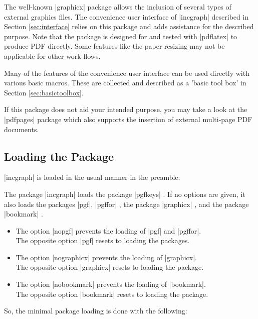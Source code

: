 \documentclass[a4paper,11pt]{ltxdoc}
\begin{document}
The well-known |graphicx| package \cite{carlisle:1999a} allows the inclusion
of several types of external graphics files. The convenience user interface
of |incgraph| described in Section \ref{sec:interface} relies on this package and adds
assistance for the described purpose. Note that the package is designed for and
tested with |pdflatex| to produce PDF directly. Some features like the paper
resizing may not be applicable for other work-flows.

Many of the features of the convenience user interface can be used directly
with various basic macros. These are collected and described
as a 'basic tool box' in Section \ref{sec:basictoolbox}.

If this package does not aid your intended purpose, you may take a look
at the |pdfpages| package \cite{matthias:2012a} which also supports the insertion of
external multi-page PDF documents.


\subsection{Loading the Package}
|incgraph| is loaded in the usual manner in the preamble:
\begin{dispListing}
\usepackage{incgraph}
\end{dispListing}

The package |incgraph| loads the package
|pgfkeys| \cite{tantau:2010c}. If no options are given, it also
loads the packages |pgf|, |pgffor| \cite{tantau:2010c},
the package |graphicx| \cite{carlisle:1999a}, and the
package |bookmark| \cite{oberdiek:2011a}.

\begin{itemize}
\item The option |nopgf| prevents the loading of |pgf| and |pgffor|.\\
  The opposite option |pgf| resets to loading the packages.
\item The option |nographicx| prevents the loading of |graphicx|.\\
  The opposite option |graphicx| resets to loading the package.
\item The option |nobookmark| prevents the loading of |bookmark|.\\
  The opposite option |bookmark| resets to loading the package.
\end{itemize}

So, the minimal package loading is done with the following:
\begin{dispListing}
\usepackage[nopgf,nographicx,nobookmark]{incgraph}
\end{dispListing}
\end{document}
